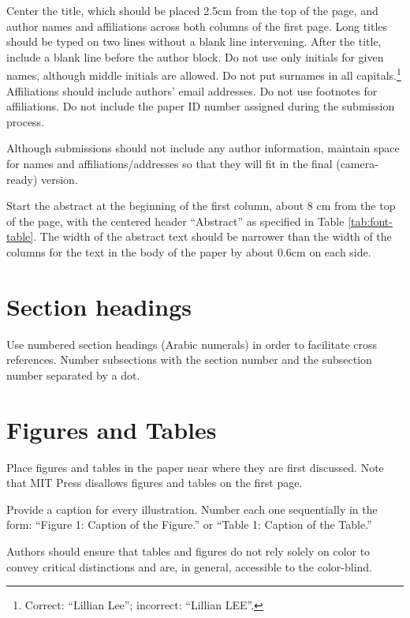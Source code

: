 \documentclass[11pt,a4paper]{article}
\begin{document}
Center the title, which should be placed 2.5cm from the top of the page,
\iftaclpubformat
and author names and affiliations
\fi
across both columns of the first page. Long titles should be typed on two lines
without a blank line intervening.
\iftaclpubformat
After the title, include a blank line before the author block.
Do not use only initials for given names, although middle initials are allowed.
Do not put surnames in all capitals.\footnote{Correct: ``Lillian Lee'';
incorrect: ``Lillian LEE''.} Affiliations should include authors' email
addresses. Do not use footnotes for affiliations.
\else
Do not include the paper ID number assigned during the submission process.
\fi

\iftaclpubformat
\else
Although submissions should not include any author information, maintain space
for names and affiliations/addresses so that they will fit in the final
(camera-ready)
version.
\fi


Start the abstract at the beginning of the first
column, about 8 cm from the top of the page, with the centered header
``Abstract'' as specified in Table \ref{tab:font-table}.
The width of the abstract text
should be narrower than the width of the columns for the text in the body of the
paper by about 0.6cm on each side.

\section{Section headings}

Use numbered section headings (Arabic numerals) in order to facilitate cross
references. Number subsections with the section number and the subsection number
separated by a dot.



\section{Figures and Tables}

Place figures and tables in the paper near where they are first discussed.
Note that MIT Press disallows figures and tables on the first page.

Provide a caption for every illustration. Number each one
sequentially in the form:  ``Figure 1: Caption of the Figure.'' or ``Table 1:
Caption of the Table.''

Authors should ensure that tables and figures do not rely solely on color to
convey critical distinctions and are, in general,  accessible to the
color-blind.
\end{document}
